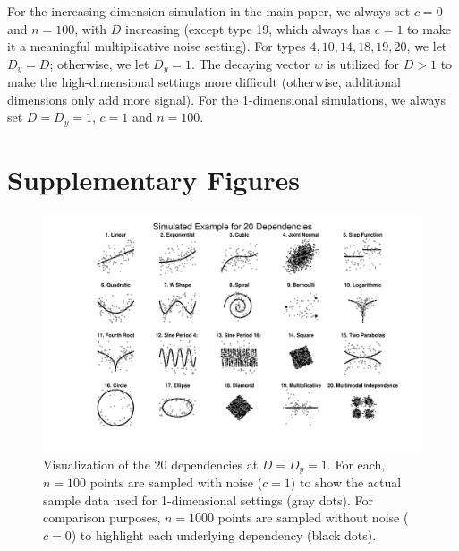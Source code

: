 \documentclass[11pt]{article}
\begin{document}
For the increasing dimension simulation in the main paper, we always set $c=0$ and $n=100$, with $D$ increasing (except type 19, which always has $c=1$ to make it a meaningful multiplicative noise setting).  For types  $4,10,14,18,19,20$, we let $D_y=D$; otherwise, we let $D_y=1$. 
The decaying vector $w$ is utilized for $D>1$ to make the high-dimensional settings more difficult (otherwise, additional dimensions only add more signal).
For the 1-dimensional simulations, we always set $D=D_y=1$, $c=1$ and $n=100$.

\clearpage

\section{Supplementary Figures}
\label{appen:figs}

\begin{figure}[htbp]
\includegraphics[trim={5cm 1.5cm 4cm 0.5cm},clip, width=1.0\textwidth]{Figures/FigSimVisual}
\caption{Visualization of the $20$ dependencies at $D=D_{y}=1$. For each, $n=100$ points are sampled with noise ($c=1$) to show the actual sample data used for 1-dimensional settings (gray dots). For comparison purposes, $n=1000$ points are sampled without noise ($c=0$) to highlight each underlying dependency (black dots).
}
\label{f:dependencies}
\end{figure}
\end{document}
